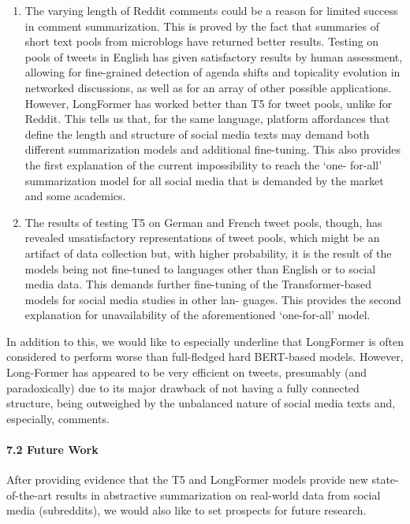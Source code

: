 \begin{enumerate}
	\item The varying length of Reddit comments could be a reason for limited success in comment summarization. This is proved by the fact that summaries of short text pools from microblogs have returned better results. Testing on pools of tweets in English has given satisfactory results by human assessment, allowing for fine-grained detection of agenda shifts and topicality evolution in networked discussions, as well as for an array of other possible applications. However, LongFormer has worked better than T5 for tweet pools, unlike for Reddit. This tells us that, for the same language, platform affordances that define the length and structure of social media texts may demand both different summarization models and additional fine-tuning. This also provides the first explanation of the current impossibility to reach the ‘one- for-all’ summarization model for all social media that is demanded by the market and some academics.
	
	\item The results of testing T5 on German and French tweet pools, though, has revealed unsatisfactory representations of tweet pools, which might be an artifact of data collection but, with higher probability, it is the result of the models being not fine-tuned to languages other than English or to social media data. This demands further fine-tuning of the Transformer-based models for social media studies in other lan- guages. This provides the second explanation for unavailability of the aforementioned ‘one-for-all’ model.
\end{enumerate}

In addition to this, we would like to especially underline that LongFormer is often considered to perform worse than full-fledged hard BERT-based models. However, Long-Former has appeared to be very efficient on tweets, presumably (and paradoxically) due to its major drawback of not having a fully connected structure, being outweighed by the unbalanced nature of social media texts and, especially, comments.

\paragraph{7.2 Future Work}
After providing evidence that the T5 and LongFormer models provide new state-of-the-art results in abstractive summarization on real-world data from social media (subreddits), we would also like to set prospects for future research.

